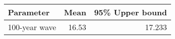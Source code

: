 \begin{tabular}{lrr}
\toprule
     Parameter &   Mean &  95\% Upper bound \\
\midrule
 100-year wave &  16.53 &            17.233 \\
\bottomrule
\end{tabular}
